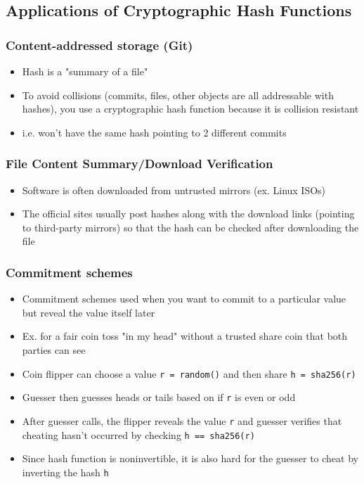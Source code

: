 \documentclass[letterpaper,12pt]{article}
\begin{document}
\subsection{Applications of Cryptographic Hash Functions}
\subsubsection{Content-addressed storage (Git)}
\begin{itemize}
 \item Hash is a "summary of a file"
 \item To avoid collisions (commits, files, other objects are all addressable with hashes), you use a cryptographic hash function because it is collision resistant
 \item i.e. won't have the same hash pointing to 2 different commits
\end{itemize}

\subsubsection{File Content Summary/Download Verification}
\begin{itemize}
 \item Software is often downloaded from untrusted mirrors (ex. Linux ISOs)
 \item The official sites usually post hashes along with the download links (pointing to third-party mirrors) so that the hash can be checked after downloading the file
\end{itemize}

\subsubsection{Commitment schemes}
\begin{itemize}
 \item Commitment schemes used when you want to commit to a particular value but reveal the value itself later
 \item Ex. for a fair coin toss "in my head" without a trusted share coin that both parties can see
 \item Coin flipper can choose a value \lstinline{r = random()} and then share \lstinline{h = sha256(r)}
 \item Guesser then guesses heads or tails based on if \lstinline{r} is even or odd
 \item After guesser calls, the flipper reveals the value \lstinline{r} and guesser verifies that cheating hasn't occurred by checking \lstinline{h == sha256(r)}
 \item Since hash function is noninvertible, it is also hard for the guesser to cheat by inverting the hash \lstinline{h}
\end{itemize}
\end{document}
